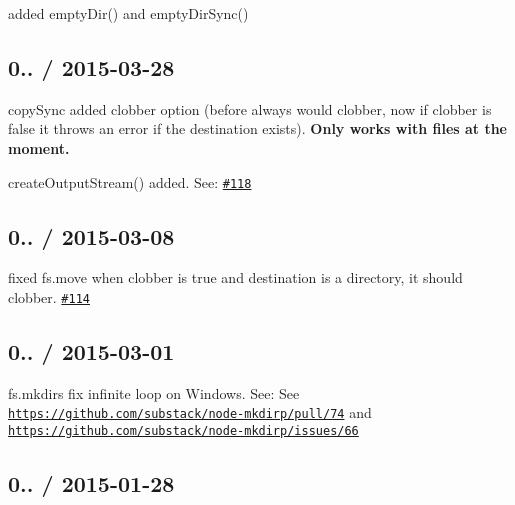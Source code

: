 \begin{DoxyItemize}
\item added {\ttfamily empty\+Dir()} and {\ttfamily empty\+Dir\+Sync()}
\end{DoxyItemize}

\subsection*{0.. / 2015-\/03-\/28 }


\begin{DoxyItemize}
\item {\ttfamily copy\+Sync} added {\ttfamily clobber} option (before always would clobber, now if {\ttfamily clobber} is {\ttfamily false} it throws an error if the destination exists). {\bfseries Only works with files at the moment.}
\item {\ttfamily create\+Output\+Stream()} added. See\+: \href{https://github.com/jprichardson/node-fs-extra/pull/118}{\tt \#118}
\end{DoxyItemize}

\subsection*{0.. / 2015-\/03-\/08 }


\begin{DoxyItemize}
\item fixed {\ttfamily fs.\+move} when {\ttfamily clobber} is {\ttfamily true} and destination is a directory, it should clobber. \href{https://github.com/jprichardson/node-fs-extra/issues/114}{\tt \#114}
\end{DoxyItemize}

\subsection*{0.. / 2015-\/03-\/01 }


\begin{DoxyItemize}
\item {\ttfamily fs.\+mkdirs} fix infinite loop on Windows. See\+: See \href{https://github.com/substack/node-mkdirp/pull/74}{\tt https\+://github.\+com/substack/node-\/mkdirp/pull/74} and \href{https://github.com/substack/node-mkdirp/issues/66}{\tt https\+://github.\+com/substack/node-\/mkdirp/issues/66}
\end{DoxyItemize}

\subsection*{0.. / 2015-\/01-\/28 }


